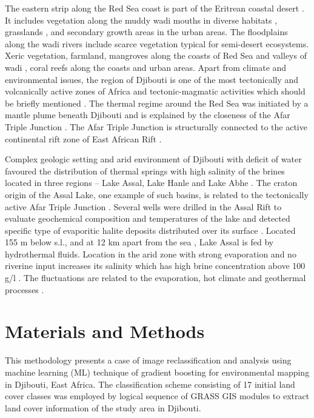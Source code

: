 \documentclass[jimaging,article,submit,pdftex,moreauthors]{Definitions/mdpi}
\begin{document}
The eastern strip along the Red Sea coast is part of the Eritrean coastal desert \cite{TESFAI2021104327}. It includes vegetation along the muddy wadi mouths in diverse habitats \cite{MEDIN201526}, grasslands \cite{ALI20231,IDOWU2020e00402}, and secondary growth areas in the urban areas. The floodplains along the wadi rivers include scarce vegetation typical for semi-desert ecosystems. Xeric vegetation, farmland, mangroves along the coasts of Red Sea and valleys of wadi \cite{BLANCOSACRISTAN2022157098,BEYIN2024100247}, coral reefs along the coasts \cite{Klaus2015,COWBURN2019182,GAPPER2024e38249} and urban areas. Apart from climate and environmental issues, the region of Djibouti is one of the most tectonically and volcanically active zones of Africa and tectonic-magmatic activities which should be briefly mentioned \cite{Chandrasekharam,MOUSSA2023104765,AYELE2024105236,JALLUDIN1994237}. The thermal regime around the Red Sea was initiated by a mantle plume beneath Djibouti and is explained by the closeness of the Afar Triple Junction \cite{RIME2023104519,GIDAFIE2024102037,DARRAH201316}. The Afar Triple Junction is structurally connected to the active continental rift zone of East African Rift \cite{Varet2022,Lemenkova202206,PINZUTI2010169,Lemenkova202205,MESHESHA2021e08634}. 

Complex geologic setting and arid environment of Djibouti with deficit of water favoured the distribution of thermal springs with high salinity of the brines located in three regions -- Lake Assal, Lake Hanle and Lake Abhe \cite{MOLOGNI2021107896}. The craton origin of the Assal Lake, one example of such basins, is related to the tectonically active Afar Triple Junction \cite{HOUSSEIN2010220,AWALEH2024102894,Houssein02112014}. Several wells were drilled in the Assal Rift to evaluate geochemical composition and temperatures of the lake \cite{DAMORE1998197} and detected specific type of evaporitic halite deposits distributed over its surface \cite{CASTANIER1992811}. Located 155 m below s.l., and at 12 km apart from the sea \cite{GASSE198967}, Lake Assal is fed by hydrothermal fluids. Location in the arid zone with strong evaporation and no riverine input increases its salinity which has high brine concentration above 100 g/l \cite{DEKOV2021120126}. The fluctuations are related to the evaporation, hot climate and geothermal processes \cite{ZAN1990561}. 


\section{Materials and Methods}
This methodology presents a case of image reclassification and analysis using machine learning (ML) technique of gradient boosting for environmental mapping in Djibouti, East Africa. The classification scheme consisting of 17 initial land cover classes was employed by logical sequence of GRASS GIS modules to extract land cover information of the study area in Djibouti. 
\end{document}
